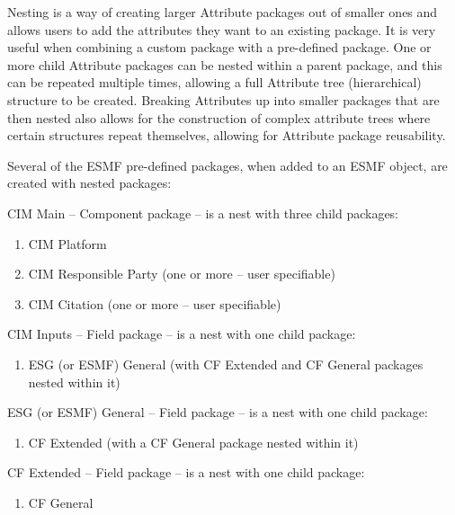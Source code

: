 %


\label{sec:AttPackNesting}


Nesting is a way of creating larger Attribute packages out of smaller ones and allows users to add the attributes they want to an existing package. It is very useful when combining a custom package with a pre-defined package. One or more child Attribute packages can be nested within a parent package, and this can be repeated multiple times, allowing a full Attribute tree (hierarchical) structure to be created.  Breaking Attributes up into smaller packages that are then nested also allows for the construction of complex attribute trees where certain structures repeat themselves, allowing for Attribute package reusability.


Several of the ESMF pre-defined packages, when added to an ESMF object, are created with nested packages:

CIM Main -- Component package -- is a nest with three child packages:
\begin{enumerate}
   \item CIM Platform
   \item CIM Responsible Party (one or more -- user specifiable)
   \item CIM Citation (one or more -- user specifiable)
\end{enumerate}

CIM Inputs -- Field package -- is a nest with one child package:
\begin{enumerate}
   \item ESG (or ESMF) General (with CF Extended and CF General packages nested within it)
\end{enumerate}

ESG (or ESMF) General -- Field package -- is a nest with one child package:
\begin{enumerate}
   \item CF Extended (with a CF General package nested within it)
\end{enumerate}

CF Extended -- Field package -- is a nest with one child package:
\begin{enumerate}
   \item CF General
\end{enumerate}


